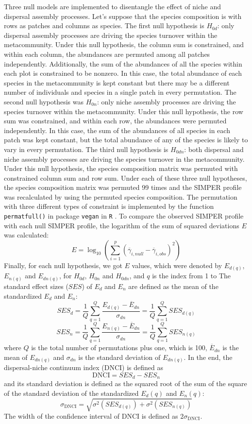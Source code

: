 Three null models are implemented to disentangle the effect of niche and dispersal assembly processes. Let's suppose that the species composition is with rows as patches and columns as species. The first null hypothesis is $H_{0d}$: only dispersal assembly processes are driving the species turnover within the metacommunity. Under this null hypothesis, the column sum is constrained, and within each column, the abundances are permuted among all patches independently. Additionally, the sum of the abundances of all the species within each plot is constrained to be nonzero. In this case, the total abundance of each species in the metacommunity is kept constant but there may be a different number of individuals and species in a single patch in every permutation. The second null hypothesis was $H_{0n}$: only niche assembly processes are driving the species turnover within the metacommunity. Under this null hypothesis, the row sum was constrained, and within each row, the abundances were permuted independently. In this case, the sum of the abundances of all species in each patch was kept constant, but the total abundance of any of the species is likely to vary in every permutation. The third null hypothesis is $H_{0dn}$: both dispersal and niche assembly processes are driving the species turnover in the metacommunity. Under this null hypothesis, the species composition matrix was permuted with constrained column sum and row sum. Under each of these three null hypotheses, the species composition matrix was permuted 99 times and the SIMPER profile was recalculated by using the permuted species composition. The permutation with three different types of constraint is implemented by the function \texttt{permatfull()} in package \texttt{vegan} in \texttt{R} \citep{R}. To compare the observed SIMPER profile with each null SIMPER profile, the logarithm of the sum of squared deviations $E$ was calculated: 
\[
E = \log_{10}(\sum_{i=1}^p(\overline{\gamma}_{i,null} - \overline{\gamma}_{i,obs})^2)
\]
Finally, for each null hypothesis, we got \DIFdelbegin {}\DIFdelend \DIFaddbegin {}\DIFaddend $E$ values, which were denoted by $E_{d(q)}$, $E_{n(q)}$ and $E_{dn(q)}$, for $H_{0d}$, $H_{0n}$ and $H_{0dn}$, and $q$ is the index from 1 to \DIFdelbegin {}\DIFdelend \DIFaddbegin {}\DIFaddend The standard effect sizes ($SES$) of $E_d$ and $E_n$ are defined as the mean of the standardized $E_d$ and $E_n$:
\[
SES_d = \frac{1}{Q}\sum_{q=1}^Q \dfrac{E_{d(q)} - \overline{E}_{dn}}{\sigma_{dn}} = \frac{1}{Q}\sum_{q=1}^Q SES_{d(q)}
\]
\[
SES_n = \frac{1}{Q}\sum_{q=1}^Q \dfrac{E_{n(q)} - \overline{E}_{dn}}{\sigma_{dn}} = \frac{1}{Q}\sum_{q=1}^Q SES_{n(q)}
\]
where $Q$ is the total number of permutations plus one, which is 100, $\overline{E}_{dn}$ is the mean of $E_{dn(q)}$ and $\sigma_{dn}$ is the standard deviation of $E_{dn(q)}$. In the end, the dispersal-niche continuum index (DNCI) is defined as
\[
\text{DNCI} = SES_d - SES_n
\]
and its standard deviation is defined as the squared root of the sum of the square of the standard deviation of the standardized $E_d(q)$ and $E_n(q)$:
\[
\sigma_{\text{DNCI}} = \sqrt{\sigma^2(SES_{d(q)}) + \sigma^2(SES_{n(q)})}
\]
The width of the confidence interval of DNCI is defined as $2\sigma_{\text{DNCI}}$.


